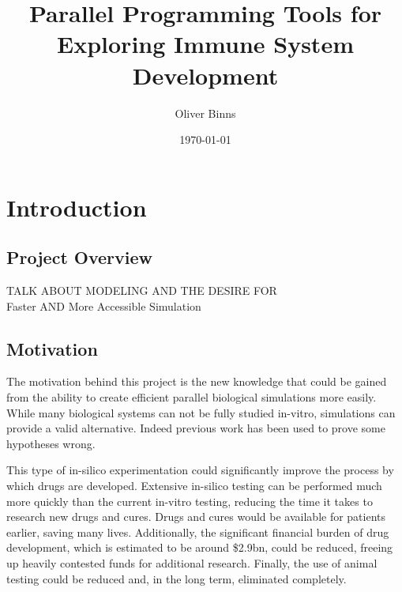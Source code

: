 \documentclass{UoYCSproject}
\title{Parallel Programming Tools for Exploring Immune System Development}
\author{Oliver Binns}
\date{\today}
\begin{document}
\maketitle
\listoffigures
\listoftables
\renewcommand*{\lstlistlistingname}{List of Listings}
\lstlistoflistings


\chapter{Introduction}
\section{Project Overview}
TALK ABOUT MODELING AND THE DESIRE FOR 
\\
Faster AND More Accessible Simulation

\section{Motivation}
The motivation behind this project is the new knowledge that could be gained from the ability to create efficient parallel biological simulations more easily.
While many biological systems can not be fully studied in-vitro, simulations can provide a valid alternative.
Indeed previous work has been used to prove some hypotheses wrong.

This type of in-silico experimentation could significantly improve the process by which drugs are developed.
Extensive in-silico testing can be performed much more quickly than the current in-vitro testing, reducing the time it takes to research new drugs and cures.
Drugs and cures would be available for patients earlier, saving many lives.
Additionally, the significant financial burden of drug development, which is estimated to be around \$2.9bn\cite{drug_cost}, could be reduced, freeing up heavily contested funds for additional research.
Finally, the use of animal testing could be reduced and, in the long term, eliminated completely.
\end{document}

